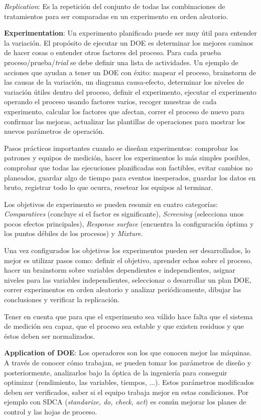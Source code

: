 \documentclass[oneside]{book}
\begin{document}
\textit{Replication}: Es la repetición del conjunto de todas las combinaciones de tratamientos para ser comparadas en un experimento en orden aleatorio.

\textbf{Experimentation}: Un experimento planificado puede ser muy útil para entender la variación. El propósito de ejecutar un DOE es determinar los mejores caminos de hacer cosas o entender otros factores del proceso. Para cada prueba proceso/prueba/\textit{trial} se debe definir una lista de actividades. Un ejemplo de acciones que ayudan a tener un DOE con éxito: mapear el proceso, brainstorm de las causas de la variación, un diagrama causa-efecto, determinar los niveles de variación útiles dentro del proceso, definir el experimento, ejecutar el experimento operando el proceso usando factores varios, recoger muestras de cada experimento, calcular los factores que afectan, correr el proceso de nuevo para confirmar las mejoras, actualizar las plantillas de operaciones para mostrar los nuevos parámetros de operación.

Pasos prácticos importantes cuando se diseñan experimentos: comprobar los patrones y equipos de medición, hacer los experimentos lo más simples posibles, comprobar que todas las ejecuciones planificadas son factibles, evitar cambios no planeados, guardar algo de tiempo para eventos inesperados, guardar los datos en bruto, registrar todo lo que ocurra, resetear los equipos al terminar.

Los objetivos de experimento se pueden resumir en cuatro categorías: \textit{Comparatives} (concluye si el factor es significante), \textit{Screening} (selecciona unos pocos efectos principales), \textit{Response surface} (encuentra la configuración óptima y los puntos débiles de los procesos) y \textit{Mixture}.

Una vez configurados los objetivos los experimentos pueden ser desarrollados, lo mejor es utilizar pasos como: definir el objetivo, aprender echos sobre el proceso, hacer un brainstorm sobre variables dependientes e independientes, asignar niveles para las variables independientes, seleccionar o desarrollar un plan DOE, correr experimentos en orden aleatorio y analizar periódicamente, dibujar las conclusiones y verificar la replicación.

Tener en cuenta que para que el experimento sea válido hace falta que el sistema de medición sea capaz, que el proceso sea estable y que existen residuos y que éstos deben ser normalizados.

\textbf{Application of DOE}: Los operadores son los que conocen mejor las máquinas. A través de conocer cómo trabajan, se pueden tomar los parámetros de diseño y posteriormente, analizarlos bajo la óptica de la ingeniería para conseguir optimizar (rendimiento, las variables, tiempos, ...). Estos parámetros modificados deben ser verificados, saber si el equipo trabaja mejor en estas condiciones. Por ejemplo con SDCA (\textit{standarize, do, check, act}) es común mejorar los planes de control y las hojas de proceso.
\end{document}
